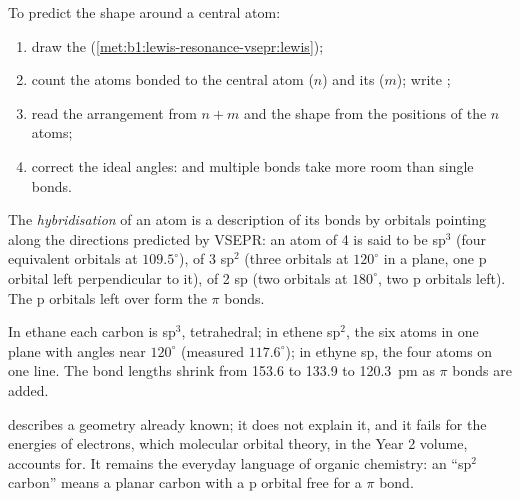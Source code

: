 \begin{method}\label{met:b1:lewis-resonance-vsepr:vsepr}
To predict the shape around a central atom:
\begin{enumerate}
  \item draw the  (\cref{met:b1:lewis-resonance-vsepr:lewis});
  \item count the atoms bonded to the central atom ($n$) and its  ($m$); write ;
  \item read the arrangement from $n + m$ and the shape from the
        positions of the $n$ atoms;
  \item correct the ideal angles:  and multiple bonds take more
        room than single bonds.
\end{enumerate}
\end{method}

\begin{definition}[Hybridisation]\label{def:b1:lewis-resonance-vsepr:hybridisation}
The \emph{hybridisation} of an atom is a
description of its bonds by orbitals pointing along the directions
predicted by VSEPR: an atom of  4 is said to be sp$^3$
(four equivalent orbitals at $109.5^\circ$), of  3 sp$^2$
(three orbitals at $120^\circ$ in a plane, one p orbital left
perpendicular to it), of  2 sp (two orbitals at $180^\circ$,
two p orbitals left). The p orbitals left over form the $\pi$ bonds.
\end{definition}

\begin{example}\label{ex:b1:lewis-resonance-vsepr:carbon}
In ethane each carbon is sp$^3$, tetrahedral; in ethene sp$^2$, the six
atoms in one plane with angles near $120^\circ$ (measured 
$117.6^\circ$); in ethyne sp, the four atoms on one line. The bond
lengths shrink from 153.6 to 133.9 to \qty{120.3}{pm} as $\pi$ bonds are
added.
\end{example}

\begin{remark}\label{rem:b1:lewis-resonance-vsepr:hybrid-limit}
 describes a geometry already known; it does not explain
it, and it fails for the energies of electrons, which molecular orbital
theory, in the Year 2 volume, accounts for. It remains the everyday
language of organic chemistry: an ``sp$^2$ carbon'' means a planar
carbon with a p orbital free for a $\pi$ bond.
\end{remark}

